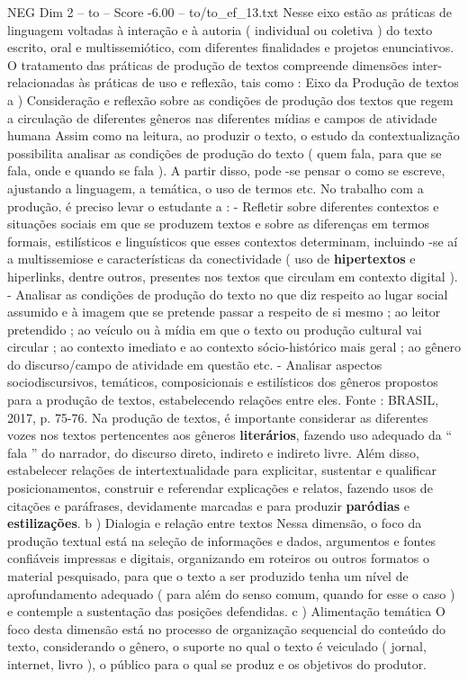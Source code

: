 \begin{textsample}{NEG Dim 2 – to – Score -6.00 – to/to\_ef\_13.txt}  \label{ex:f2_neg_153}
Nesse eixo estão as práticas de linguagem voltadas à interação e à autoria ( individual ou coletiva ) do texto escrito, oral e multissemiótico, com diferentes finalidades e projetos enunciativos.
O tratamento das práticas de produção de textos compreende dimensões inter-relacionadas às práticas de uso e reflexão, tais como : Eixo da Produção de textos a ) Consideração e reflexão sobre as condições de produção dos textos que regem a circulação de diferentes gêneros nas diferentes mídias e campos de atividade humana Assim como na leitura, ao produzir o texto, o estudo da contextualização possibilita analisar as condições de produção do texto ( quem fala, para que se fala, onde e quando se fala ).
A partir disso, pode -se pensar o como se escreve, ajustando a linguagem, a temática, o uso de termos etc.
No trabalho com a produção, é preciso levar o estudante a : - Refletir sobre diferentes contextos e situações sociais em que se produzem textos e sobre as diferenças em termos formais, estilísticos e linguísticos que esses contextos determinam, incluindo -se aí a multissemiose e características da conectividade ( uso de \textbf{hipertextos} e hiperlinks, dentre outros, presentes nos textos que circulam em contexto digital ). - Analisar as condições de produção do texto no que diz respeito ao lugar social assumido e à imagem que se pretende passar a respeito de si mesmo ; ao leitor pretendido ; ao veículo ou à mídia em que o texto ou produção cultural vai circular ; ao contexto imediato e ao contexto sócio-histórico mais geral ; ao gênero do discurso/campo de atividade em questão etc. - Analisar aspectos sociodiscursivos, temáticos, composicionais e estilísticos dos gêneros propostos para a produção de textos, estabelecendo relações entre eles.
Fonte : BRASIL, 2017, p. 75-76.
Na produção de textos, é importante considerar as diferentes vozes nos textos pertencentes aos gêneros \textbf{literários}, fazendo uso adequado da “ fala ” do narrador, do discurso direto, indireto e indireto livre.
Além disso, estabelecer relações de intertextualidade para explicitar, sustentar e qualificar posicionamentos, construir e referendar explicações e relatos, fazendo usos de citações e paráfrases, devidamente marcadas e para produzir \textbf{paródias} e \textbf{estilizações}. b ) Dialogia e relação entre textos Nessa dimensão, o foco da produção textual está na seleção de informações e dados, argumentos e fontes confiáveis impressas e digitais, organizando em roteiros ou outros formatos o material pesquisado, para que o texto a ser produzido tenha um nível de aprofundamento adequado ( para além do senso comum, quando for esse o caso ) e contemple a sustentação das posições defendidas. c ) Alimentação temática O foco desta dimensão está no processo de organização sequencial do conteúdo do texto, considerando o gênero, o suporte no qual o texto é veiculado ( jornal, internet, livro ), o público para o qual se produz e os objetivos do produtor.

\end{textsample}
